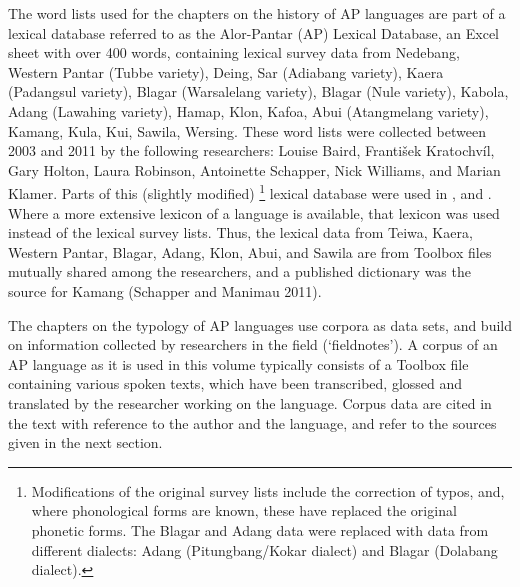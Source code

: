 \clearpage 
The word lists used for the chapters on the history of AP languages are part of a lexical database referred to as the Alor-Pantar (AP) Lexical Database, an Excel sheet with over  400 words, containing lexical survey data from Nedebang, Western Pantar (Tubbe variety), Deing, Sar (Adiabang variety), Kaera (Padangsul variety), Blagar (Warsalelang variety), Blagar (Nule variety), Kabola, Adang (Lawahing variety), Hamap, Klon, Kafoa, Abui (Atangmelang variety), Kamang, Kula, Kui, Sawila, Wersing. These word lists were collected between 2003 and 2011 by the following researchers: Louise Baird, Franti\v{s}ek Kratochv\'il, Gary Holton, Laura Robinson, Antoinette Schapper, Nick Williams, and Marian Klamer. Parts of this (slightly modified){} \footnote{Modifications of the original survey lists include the correction of typos, and, where phonological forms are known, these have replaced the original phonetic forms. The Blagar and Adang data were replaced with data from different dialects: Adang (Pitungbang/Kokar dialect) and Blagar (Dolabang dialect).} lexical database were used in \citet{HoltonRobinsonTVhistory,HoltonRobinsonTVposition}, and \citet{SchapperEtAlTVtimor}. Where a more extensive lexicon of a language is available, that lexicon was used instead of the lexical survey lists. Thus, the lexical data from Teiwa, Kaera, Western Pantar, Blagar, Adang, Klon, Abui, and Sawila are from Toolbox files mutually shared among the researchers, and a published dictionary was the source for Kamang (Schapper and Manimau 2011).  

The chapters on the typology of AP languages use corpora as data sets, and build on information collected by researchers in the field (`fieldnotes'). A corpus of an AP language as it is used in this volume typically consists of a Toolbox file containing various spoken texts, which have been transcribed, glossed and translated by the researcher working on the language. Corpus data are cited in the text with reference to the author and the language, and refer to the  sources given in the next section.
 
